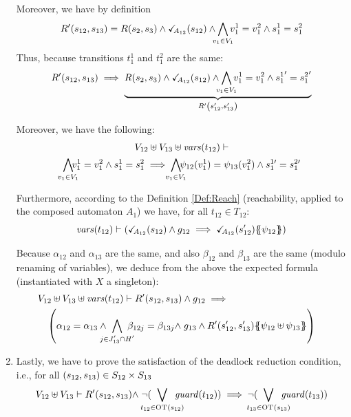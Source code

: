 \documentclass[runningheads]{llncs}
\begin{document}
\begin{enumerate}
Moreover, we have by definition 
\[R' \mpar{s_{12}, s_{13}} =  R\mpar{s_{2}, s_{3}} \land \reach{A_{12}}(s_{12}) \wedge \bigwedge_\subbox{v_1\in V_1} v^1_1=v^2_1\wedge s^1_1 = s^2_1 \]
Thus, because transitions $t^1_1$ and  $t^2_1$ are the same:
\[R' \mpar{s_{12}, s_{13}} \implies
\underbrace{R\mpar{s_{2}, s_{3}} \land \reach{A_{12}}(s_{12}) \wedge \bigwedge_\subbox{v_1\in V_1} v^1_1=v^2_1\wedge {s^1_1}^\prime = {s^2_1}^\prime}_{R' \mpar{s'_{12}, s'_{13}}}
\]


Moreover, we have  the following:
\begin{multline*}
V_{12} \uplus V_{13}  \uplus \fvars{t_{12}} \vdash\\
\bigwedge_\subbox{v_1\in V_1}\!\! v^1_1=v^2_1  \wedge s^1_1 = s^2_1 \implies \bigwedge_\subbox{v_1\in V_1}\!\! \psi_{12}(v^1_1)=\psi_{13}(v^2_1)  \wedge s^{1\prime}_1 = s^{2\prime}_1 
\end{multline*}
  

 
 Furthermore, according to the Definition \ref{Def:Reach} (reachability, applied to the composed automaton \(A_1\)) we have, for all $t_{12} \in T_{12}$:
\[ \fvars{t_{12}} \vdash \left(\reach{A_{12}}\mpar{s_{12}} \wedge g_{12} \implies \reach{A_{12}}\mpar{s_{12}'}\psubst{\psi_{12}}\right) \]	

Because $\alpha_{12}$ and $\alpha_{13}$ are the same, and also  $\beta_{12}$ and $\beta_{13}$ are the same (modulo renaming of variables), we deduce from the above the expected formula (instantiated with $X$ a singleton): %
\begin{multline*}
V_{12} \uplus V_{13}  \uplus \fvars{t_{12}} \vdash
R'\mpar{s_{12}, s_{13}} \wedge g_{12} 
\implies \hspace{10em}\\ %
 \mpar{\everymath{\displaystyle}
			\alpha_{12} = \alpha_{13} \wedge \bigwedge_\subbox{j \in J'_{13} \cap H'} \beta_{12j} = \beta_{13j} \nwedge g_{13} \wedge 
			 R'\mpar{s'_{12}, s'_{13}}\psubst{\psi_{12} \uplus \psi_{13}}
}   
\end{multline*}	






\item Lastly, we have to prove the satisfaction of the deadlock reduction condition, i.e., for all ${\left(s_{12}, s_{13}\right)} \in S_{12} \times S_{13}$
\begin{multline*}
V_{12} \uplus V_{13}  \vdash  R'\mpar{s_{12}, s_{13}} \nwedge  \neg(\bigvee_\subbox{t_{12} \in \fOT{s_{12}}} \fguard{t_{12}}) \implies   \neg (\bigvee_\subbox{t_{13} \in \fOT{s_{13}}} \fguard{t_{13}}) 
\end{multline*}


\end{enumerate}
\end{document}
